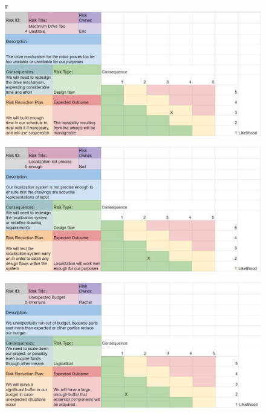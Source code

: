 \begin{figure}[h!]r
\centering
\includegraphics[width=0.98\columnwidth]{risks/risk4.JPG}
\label{fig:risk4}
\end{figure}
\begin{figure}[!ht]
\centering
\includegraphics[width=0.98\columnwidth]{risks/risk5.JPG}
\label{fig:risk5}
\end{figure}
\begin{figure}[!ht]
\centering
\includegraphics[width=0.98\columnwidth]{risks/risk6.JPG}
\label{fig:risk6}
\end{figure}

\clearpage
